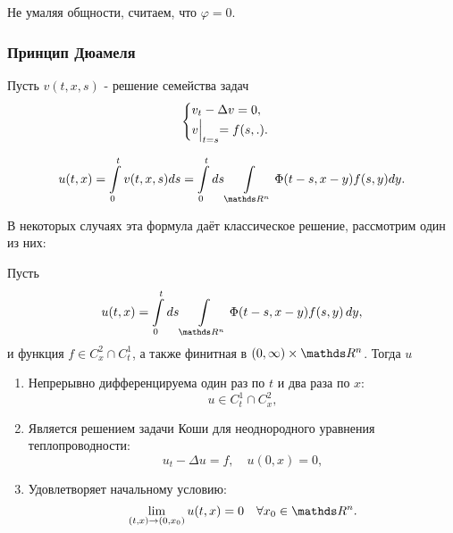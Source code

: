 Не умаляя общности, считаем, что $\varphi = 0$.

\subsubsection*{Принцип Дюамеля}

Пусть $v(t,x,s)$ - решение семейства задач
\begin{equation*}
    \begin{cases} 
        v_t - \Delta v = 0, \\
        v\Bigl|_{t=s} = f(s, .).
    \end{cases}
\end{equation*}

$$u(t,x) = \int\limits_0^tv(t,x,s)ds = \int\limits_0^t ds \int\limits_{\real^n}\Phi(t-s, x-y)f(s,y)dy.$$

В некоторых случаях эта формула даёт классическое решение, рассмотрим один из них:

\begin{theorem}
Пусть $$u(t,x) = \int\limits_0^t ds \int \limits_{\real^n} \Phi (t-s, x-y) f(s,y) \, dy ,$$ и функция $f\in C_x^2 \cap C_t^1$, а также финитная в $(0, \infty) \times \real^n$. Тогда $u$
\begin{enumerate}
\item Непрерывно дифференцируема один раз по $t$ и два раза по $x$: $$u \in C_t^1 \cap C_x^2,$$
\item Является решением задачи Коши для неоднородного уравнения теплопроводности: $$u_t - \Delta u = f, \quad u(0,x) = 0,$$
\item Удовлетворяет начальному условию: $$\lim_{(t,x) \to (0,x_0)} u(t,x) = 0 \quad  \forall x_0 \in \real^n.$$
\end{enumerate}
\end{theorem}

